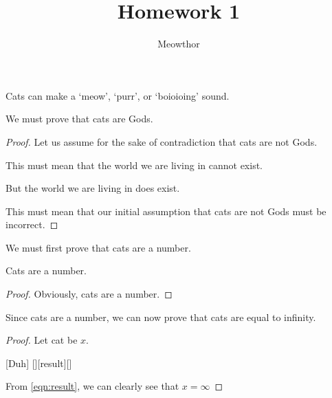 \documentclass{assignmeownt}
\title{Homework 1}
\author{Meowthor}
\date{}
\begin{document}
\maketitle
\thispagestyle{firststyle}

\question
{}
\par Cats can make a `meow', `purr', or `boioioing' sound.

\bigskip


We must prove that cats are Gods.

\begin{proof}
  \par Let us assume for the sake of contradiction that cats are not Gods.
  \par This must mean that the world we are living in cannot exist.
  \par But the world we are living in does exist.
  \par This must mean that our initial assumption that cats are not Gods must be incorrect.
\end{proof}

\par {}

\par We must first prove that cats are a number.
\begin{lemma}
  Cats are a number.
\end{lemma}
\begin{proof}
  \par Obviously, cats are a number.
\end{proof}

\par Since cats are a number, we can now prove that cats are equal to infinity.
\begin{proof}
  Let cat be \( x \).
  \begin{meowquation}
    [Duh]
    [][result][]
  \end{meowquation}

  \par From \eqref{eqn:result}, we can clearly see that \( x = \infty \)
\end{proof}

\par {}
\end{document}
